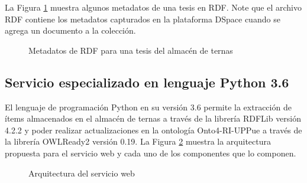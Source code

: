 La Figura \ref{resultadoRdf} muestra algunos metadatos de una tesis en RDF. Note que el archivo RDF contiene los metadatos capturados en la plataforma DSpace cuando se agrega un documento a la colecci\'on.

\begin{figure}[!ht]
	\centering
    \caption{Metadatos de RDF para una tesis del almac\'en de ternas}
    \label{resultadoRdf}
\end{figure}

\subsection{Servicio especializado en lenguaje Python 3.6}

El lenguaje de programaci\'on Python en su versi\'on 3.6 permite la extracci\'on de \'items almacenados en el almac\'en de ternas a trav\'es de la librer\'ia RDFLib \cite{RDFlib} versi\'on 4.2.2 y poder realizar actualizaciones en la ontolog\'ia Onto4-RI-UPPue a trav\'es de la librer\'ia OWLReady2 \cite{OWLReady2} versi\'on 0.19. La Figura \ref{arquitecturaServicio} muestra la arquitectura propuesta para el servicio web y cada uno de los componentes que lo componen.

\begin{figure}[!ht]
	\centering
    \caption{Arquitectura del servicio web}
    \label{arquitecturaServicio}
\end{figure}

